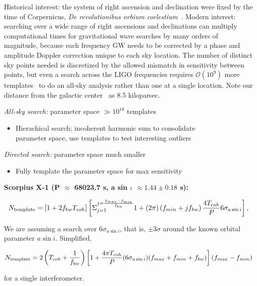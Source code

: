 Historical interest: the system of right ascension and declination were fixed by the time of Corpernicus, \textit{De revolutionibus orbium coelestium}~\cite{Hawking2002}.
Modern interest: searching over a wide range of right ascensions and declinations can multiply computational times for gravitational wave searches by many orders of magnitude, because each frequency GW needs to be corrected by a phase and amplitude Doppler correction unique to each sky location.
The number of distinct sky points needed is discretized by the allowed mismatch in sensitivity between points, but even a search across the LIGO frequencies requires $\mathcal{O}(10^9)$ more templates~\cite{GoetzTwoSpectMethods2011} to do an all-sky analysis rather than one at a single location. 
Note our distance from the galactic center~\cite{KerrLyndenBell1986} as 8.5 kiloparsec.




\emph{All-sky search: }parameter space $\gg10^{18}$ templates
\begin{itemize}
\item Hierachical search; incoherent harmonic sum to consolidate\\
parameter space, use templates to test interesting outliers
\end{itemize}

\emph{Directed search: }parameter space much smaller
\begin{itemize}
\item Fully template the parameter space for max sensitivity
\end{itemize}

\textbf{Scorpius X-1 (P $\approx$$ $ 68023.7 s, a sin $\iota$ $\approx1.44\pm0.18$
s):}


\[
N_{\textup{{template}}}=\left[1+2f_{bw}T_{coh}\right] \left[ {\displaystyle \Sigma}_{j=1}^{j = \frac{f_{max} - f_{min}}{f_{bw}}} 1 + (2\pi)\left(f_{min} + j f_{bw}\right) \frac{4 T_{coh}}{P} 6 \sigma_{a \sin i} \right],
\]

\noindent We are assuming a search over $6\sigma_{a \sin i}$, that is, $\pm 3 \sigma$ around the known orbital parameter $a\sin i$. Simplified,

\begin{equation}
N_{\textup{template}} = 2 \left(T_{coh} + \frac{1}{f_{bw}}\right)\left[ 1+\frac{4 \pi T_{coh}}{P} (6\sigma_{a \sin i})(f_{max} + f_{min} + f_{bw})\right] (f_{max} - f_{min})
\end{equation}

\noindent for a single interferometer. 

